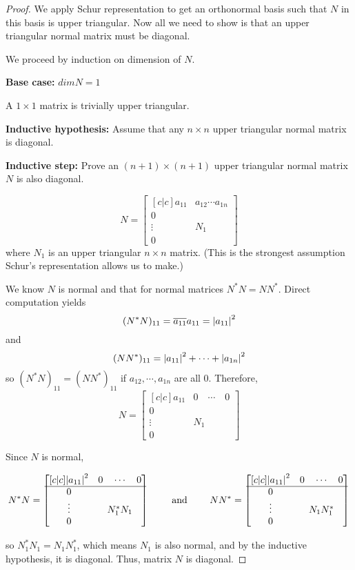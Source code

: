 \begin{proof}
We apply Schur representation to get an orthonormal basis such that $N$ in this basis is upper triangular. Now all we need to show is that an upper triangular normal matrix must be diagonal. 

We proceed by induction on dimension of $N$. 

\textbf{Base case: } $dim N = 1$

A $1 \times 1$ matrix is trivially upper triangular. 

\textbf{Inductive hypothesis: } Assume that any $n \times n$ upper triangular normal matrix is diagonal. 

\textbf{Inductive step: } Prove an $(n+1) \times (n+1)$ upper triangular normal matrix $N$ is also diagonal. 

$$N = \begin{bmatrix}[c|c]
a_{11} & a_{12} \cdots a_{1n} \\
\hline
0 & \\
\vdots & N_{1} \\
0 & 
\end{bmatrix}$$
where $N_{1}$ is an upper triangular $n \times n$ matrix. (This is the strongest assumption Schur's representation allows us to make.)

We know $N$ is normal and that for normal matrices $N^{*}N = NN^{*}$. Direct computation yields 
$$(N^{*} N)_{11} = \overline{a_{11}} a_{11} = \abs{a_{11}}^{2}$$
and 
$$(NN^{*})_{11} = \abs{a_{11}}^{2} + \cdots + \abs{a_{1n}}^{2}$$
so $(N^{*}N)_{11} = (NN^{*})_{11}$ if $a_{12}, \cdots, a_{1n}$ are all 0. Therefore, 
$$N = \begin{bmatrix}[c|c]
a_{11} & 0 \quad \cdots \quad 0 \\
\hline
0 & \\
\vdots & N_{1} \\
0 & 
\end{bmatrix}$$

Since $N$ is normal, 

$$N^{*}N = \begin{bmatrix}[c|c]
\abs{a_{11}}^{2} & 0 \quad \cdots \quad 0 \\
\hline
0 & \\
\vdots & N_{1}^{*} N_{1} \\
0 & 
\end{bmatrix} \qquad \text{ and } \qquad NN^{*} = \begin{bmatrix}[c|c]
\abs{a_{11}}^{2} & 0 \quad \cdots \quad 0 \\
\hline
0 & \\
\vdots & N_{1} N_{1}^{*} \\
0 & 
\end{bmatrix}$$

so $N_{1}^{*} N_{1} = N_{1} N_{1}^{*}$, which means $N_{1}$ is also normal, and by the inductive hypothesis, it is diagonal. Thus, matrix $N$ is diagonal. 
\end{proof}

